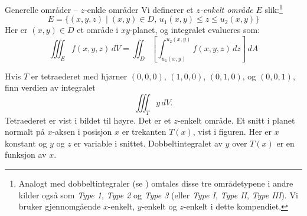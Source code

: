 \begin{defn}{Generelle områder – $z$-enkle områder}
Vi definerer et $z$\emph{-enkelt område} $E$ slik:\footnote{Analogt med dobbeltintegraler (se ) omtales disse tre områdetypene i andre kilder også som \emph{Type 1}, \emph{Type 2} og \emph{Type 3} (eller \emph{Type I}, \emph{Type II}, \emph{Type III}). Vi bruker gjennomgående $x$-enkelt, $y$-enkelt og $z$-enkelt i dette kompendiet.}
\[
E = \{(x, y, z) \mid (x, y) \in D,\, u_1(x, y) \leq z \leq u_2(x, y)\}
\]
Her er $(x, y) \in D$ et område i $xy$-planet, og integralet evalueres som:
\[
\iiint_E f(x, y, z)\, dV = \iint_D \left[\int_{u_1(x,y)}^{u_2(x,y)} f(x, y, z)\, dz\right]\, dA
\]
\end{defn}
\begin{eks}{}%
\begin{minipage}{6cm}
Hvis \( T \) er tetraederet med hjørner \((0, 0, 0)\), \((1, 0, 0)\), \((0, 1, 0)\), og \((0, 0, 1)\), finn verdien av integralet
\[
\iiint_T y \, dV.
\]
Tetraederet er vist i bildet til høyre. Det er et $z$-enkelt område. Et snitt i planet normalt på \(x\)-aksen i posisjon \(x\) er trekanten \(T(x)\), vist i figuren. Her er \(x\) konstant og \(y\) og \(z\) er variable i snittet. Dobbeltintegralet av \(y\) over \(T(x)\) er en funksjon av \(x\).
\end{minipage} 
\begin{minipage}{8cm}
\end{minipage}
\end{eks}
